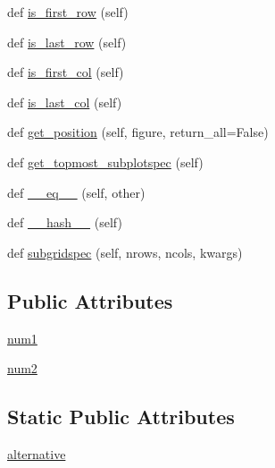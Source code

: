 \begin{DoxyCompactItemize}
def \hyperlink{classmatplotlib_1_1gridspec_1_1SubplotSpec_a8320b7a223afb23cb1d72af0fc9abb3d}{is\+\_\+first\+\_\+row} (self)
\item 
def \hyperlink{classmatplotlib_1_1gridspec_1_1SubplotSpec_a677da2035530536dee6708eb9a09355e}{is\+\_\+last\+\_\+row} (self)
\item 
def \hyperlink{classmatplotlib_1_1gridspec_1_1SubplotSpec_a6a2f63444c89f715e5a301f675fa25ad}{is\+\_\+first\+\_\+col} (self)
\item 
def \hyperlink{classmatplotlib_1_1gridspec_1_1SubplotSpec_a6c578725fd84b16b5b6e2eb95d8d078e}{is\+\_\+last\+\_\+col} (self)
\item 
def \hyperlink{classmatplotlib_1_1gridspec_1_1SubplotSpec_aa7947c11c4cf382b7ae91ddf9e539d35}{get\+\_\+position} (self, figure, return\+\_\+all=False)
\item 
def \hyperlink{classmatplotlib_1_1gridspec_1_1SubplotSpec_a5abffd71d91ce525b32c0e3ec78d6877}{get\+\_\+topmost\+\_\+subplotspec} (self)
\item 
def \hyperlink{classmatplotlib_1_1gridspec_1_1SubplotSpec_a67b19f5309033d4182adcf7f6f86588e}{\+\_\+\+\_\+eq\+\_\+\+\_\+} (self, other)
\item 
def \hyperlink{classmatplotlib_1_1gridspec_1_1SubplotSpec_ac722c61410a081bc6830d8c82a9874c9}{\+\_\+\+\_\+hash\+\_\+\+\_\+} (self)
\item 
def \hyperlink{classmatplotlib_1_1gridspec_1_1SubplotSpec_acc03db846e1376e8b32b29a1f48119e3}{subgridspec} (self, nrows, ncols, kwargs)
\end{DoxyCompactItemize}
\subsection*{Public Attributes}
\begin{DoxyCompactItemize}
\item 
\hyperlink{classmatplotlib_1_1gridspec_1_1SubplotSpec_ac04c4772b102d0b8634a5fa00d6acb56}{num1}
\item 
\hyperlink{classmatplotlib_1_1gridspec_1_1SubplotSpec_a903365a73f1070a8f41931d1fcd96e0f}{num2}
\end{DoxyCompactItemize}
\subsection*{Static Public Attributes}
\begin{DoxyCompactItemize}
\item 
\hyperlink{classmatplotlib_1_1gridspec_1_1SubplotSpec_a4923dcf21cfab5040c8e59909b988894}{alternative}
\end{DoxyCompactItemize}


